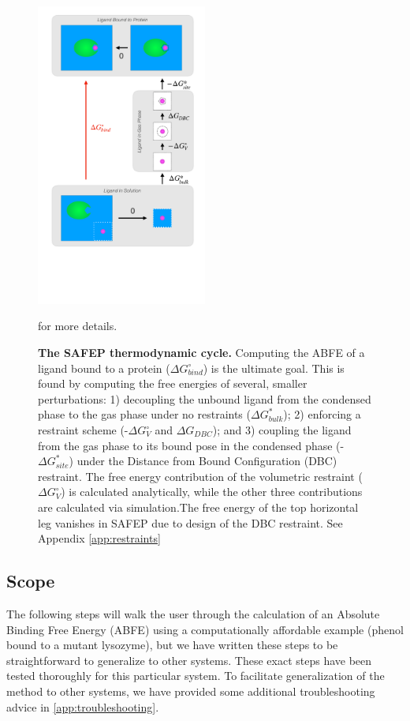\documentclass[9pt,tutorial]{Styling/livecoms}
\begin{document}
\begin{figure}[!ht]
    \centering
    \includegraphics[width=0.5\textwidth]{SAFEP_cycle.pdf}
    \caption{\textbf{The SAFEP thermodynamic cycle.} 
    Computing the ABFE of a ligand bound to a protein ($\Delta G^\circ_{bind}$) is the ultimate goal. 
    This is found by computing the free energies of several, smaller perturbations: 1) decoupling the unbound ligand from the condensed phase to the gas phase under no restraints ($\Delta G^*_{bulk}$); 2) enforcing a restraint scheme (-$\Delta G^\circ_V$ and $\Delta G_{DBC}$); and 3) coupling the ligand from the gas phase to its bound pose in the condensed phase (-$\Delta G^*_{site}$) under the Distance from Bound Configuration (DBC) restraint.
    The free energy contribution of the volumetric restraint ($\Delta G^\circ_{V}$) is calculated analytically, while the other three contributions are calculated via simulation.The free energy of the top horizontal leg vanishes in SAFEP due to design of the DBC restraint. See Appendix \ref{app:restraints}} for more details.
    \label{fig:cycle}
\end{figure}

\subsection{Scope}
The following steps will walk the user through the calculation of an Absolute Binding Free Energy (ABFE) using a computationally affordable example (phenol bound to a mutant lysozyme), but we have written these steps to be straightforward to generalize to other systems.
These exact steps have been tested thoroughly for this particular system. To facilitate generalization of the method to other systems, we have provided some additional troubleshooting advice in \ref{app:troubleshooting}.
\end{document}
